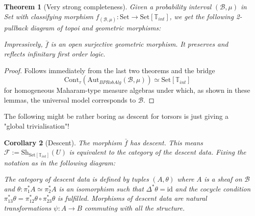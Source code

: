 \documentclass[a4paper]{amsproc}
\theoremstyle{plain}
\newtheorem{theorem}{Theorem}[section]
\newtheorem{corollary}[theorem]{Corollary}
\theoremstyle{definition}
\theoremstyle{remark}
\numberwithin{equation}{section}
\begin{document}
\begin{theorem}[Very strong completeness] Given a probability interval $(\mathcal{B},\mu)$ in Set with classifying morphism $f_{(\mathcal{B},\mu)}:\text{Set}\rightarrow \text{Set}[\mathbb{T}_{int}]$, we get the following 2-pullback diagram of topoi and geometric morphisms:
\begin{center}
\end{center}
Impressively, $\bar{f}$ is an open surjective geometric morphism. It preserves and reflects infinitary first order logic.
\end{theorem}
\begin{proof} 
Follows immediately from the last two theorems and the bridge 
\[\text{Cont}_\tau(\text{Aut}_{BPRobAlg}(\mathcal{B},\mu))\simeq \text{Set}[\mathbb{T}_{int}]\]
 for homogeneous Maharam-type measure algebras under which, as shown in these lemmas, the universal model corresponds to $\mathcal{B}$.%
\end{proof}
The following might be rather boring as descent for torsors is just giving a "global trivialisation"!
\begin{corollary}[Descent] The morphism $\bar{f}$ has descent. This means $\mathcal{F}:=\text{Sh}_{\text{Set}[\mathbb{T}_{int}]}(U)$ is equivalent to the category of the descent data.
Fixing the notation as in the following diagram:
\begin{center}
\end{center}
The category of descent data is defined by tuples $(A,\theta)$ where $A$ is a sheaf on $\mathcal{B}$ and $\theta:\pi_1^*A\simeq \pi_2^*A$ is an isomorphism such that $\Delta^*\theta=\text{id}$ and the cocycle condition $\pi_{13}^*\theta=\pi_{12}^*\theta\circ \pi_{23}^*\theta$ is fulfilled. Morphisms of descent data are natural transformations $\psi:A\rightarrow B$ commuting with all the structure.
\end{corollary}
\end{document}
